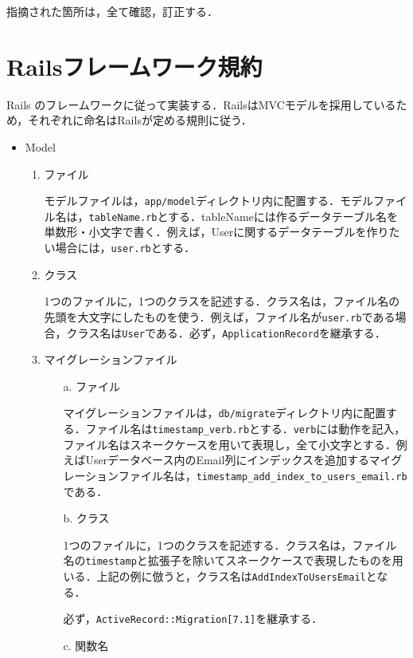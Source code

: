 指摘された箇所は，全て確認，訂正する．
\newpage

\section{Railsフレームワーク規約}\label{q3.2}
Rails のフレームワークに従って実装する．RailsはMVCモデルを採用しているため，それぞれに命名はRailsが定める規則に従う．
\begin{itemize}
    \item Model
    \begin{enumerate}
        \item ファイル
        
        モデルファイルは，\texttt{app/model}ディレクトリ内に配置する．モデルファイル名は，\texttt{tableName.rb}とする．tableNameには作るデータテーブル名を単数形・小文字で書く．例えば，Userに関するデータテーブルを作りたい場合には，\texttt{user.rb}とする．
        
        \item クラス

        1つのファイルに，1つのクラスを記述する．クラス名は，ファイル名の先頭を大文字にしたものを使う．例えば，ファイル名が\texttt{user.rb}である場合，クラス名は\texttt{User}である．必ず，\texttt{ApplicationRecord}を継承する．
        
        \item マイグレーションファイル
        \begin{enumerate}
            \item[a.] ファイル
            
            マイグレーションファイルは，\texttt{db/migrate}ディレクトリ内に配置する．ファイル名は\texttt{timestamp\_verb.rb}とする．\texttt{verb}には動作を記入，ファイル名はスネークケースを用いて表現し，全て小文字とする．例えばUserデータベース内のEmail列にインデックスを追加するマイグレーションファイル名は，\texttt{timestamp\_add\_index\_to\_users\_email.rb}である．
            \item[b.] クラス

            1つのファイルに，1つのクラスを記述する．クラス名は，ファイル名の\texttt{timestamp}と拡張子を除いてスネークケースで表現したものを用いる．上記の例に倣うと，クラス名は\texttt{AddIndexToUsersEmail}となる．
            
            必ず，\texttt{ActiveRecord::Migration[7.1]}を継承する．

            \item[c.] 関数名


\end{enumerate}
\end{enumerate}
\end{itemize}
